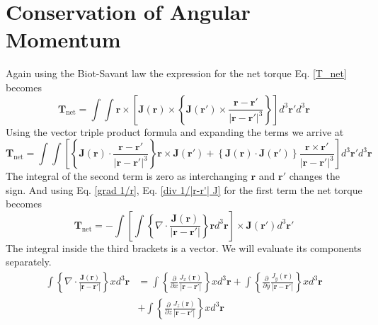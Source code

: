 \documentclass[titlepage, a4paper, 11pt]{article}
\begin{document}
\section{Conservation of Angular Momentum}
Again using the Biot-Savant law the expression for the net torque Eq. \eqref{T_net} becomes
\begin{equation}
	\mathbf{T}_\text{net} = \int \int \mathbf{r} \times \left[ \mathbf{J}(\mathbf{r}) \times
	\left\{ \mathbf{J}(\mathbf{r}') \times \frac{\mathbf{r} - \mathbf{r'}}{|\mathbf{r} -
	\mathbf{r}'|^3} \right\} \right] d^3 \mathbf{r}' d^3 \mathbf{r}
\end{equation}
Using the vector triple product formula and expanding the terms we arrive at
\begin{equation}
	\mathbf{T}_\text{net} = \int \int \left[ \left\{ \mathbf{J}(\mathbf{r}) \cdot \frac{\mathbf{r} -
	\mathbf{r'}}{|\mathbf{r} - \mathbf{r}'|^3} \right\} \mathbf{r} \times \mathbf{J}(\mathbf{r}') +
	\left\{ \mathbf{J}(\mathbf{r}) \cdot \mathbf{J}(\mathbf{r}') \right\} \frac{\mathbf{r} \times
	\mathbf{r'}}{|\mathbf{r} - \mathbf{r}'|^3} \right] d^3 \mathbf{r}' d^3 \mathbf{r}
\end{equation}
The integral of the second term is zero as interchanging $\mathbf{r}$ and $\mathbf{r}'$ changes the
sign. And using Eq. \eqref{grad 1/r}, Eq. \eqref{div 1/|r-r'| J} for the first term the net torque becomes
\begin{equation}
	\mathbf{T}_\text{net} = - \int \left[ \int \left\{ \nabla \cdot
	\frac{\mathbf{J}(\mathbf{r})}{|\mathbf{r} - \mathbf{r}'|} \right\} \mathbf{r} d^3 \mathbf{r}
	\right] \times \mathbf{J}(\mathbf{r}') d^3 \mathbf{r}'
	\label{T_net somewhat simplified}
\end{equation}
The integral inside the third brackets is a vector. We will evaluate its components separately.
\begin{equation}
	\begin{aligned}
		\int \left\{ \nabla \cdot \frac{\mathbf{J}(\mathbf{r})}{|\mathbf{r} - \mathbf{r}'|} \right\}
		x d^3\mathbf{r} &= \int \left\{ \frac{\partial}{\partial x}
		\frac{J_x(\mathbf{r})}{|\mathbf{r} - \mathbf{r}'|} \right\} x d^3\mathbf{r} + \int \left\{
		\frac{\partial}{\partial y} \frac{J_y(\mathbf{r})}{|\mathbf{r} - \mathbf{r}'|} \right\}
		x d^3\mathbf{r} \\
		&+ \int \left\{ \frac{\partial}{\partial z} \frac{J_z(\mathbf{r})}{|\mathbf{r} -
		\mathbf{r}'|} \right\} x d^3\mathbf{r}
	\end{aligned}
	\label{int div J/|r-r'| x d^3r}
\end{equation}
\end{document}
